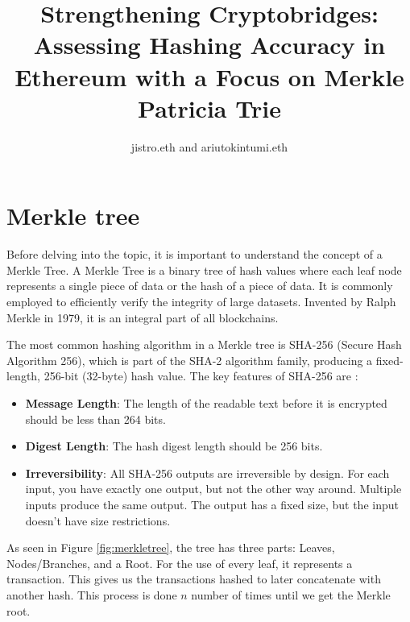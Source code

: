 \documentclass[fleqn,10pt]{olplainarticle}
\title{Strengthening Cryptobridges: Assessing Hashing Accuracy in Ethereum with a Focus on Merkle Patricia Trie}
\author[1]{jistro.eth and ariutokintumi.eth}
\begin{document}
\flushbottom
\maketitle
\thispagestyle{empty}

\tableofcontents

\section{Merkle tree}

Before delving into the topic, it is important to understand the concept of a Merkle Tree. A Merkle Tree is a binary tree of hash values where each leaf node represents a single piece of data or the hash of a piece of data. It is commonly employed to efficiently verify the integrity of large datasets. Invented by Ralph Merkle in 1979, it is an integral part of all blockchains. \cite{kumar_introMerkleTree_2023}

The most common hashing algorithm in a Merkle tree is SHA-256 (Secure Hash Algorithm 256), which is part of the SHA-2 algorithm family, producing a fixed-length, 256-bit (32-byte) hash value. The key features of SHA-256 are \cite{gitlan_whatSHA256_2023}:

\begin{itemize}
	\item \textbf{Message Length}: The length of the readable text before it is encrypted should be less than 264 bits.
	\item \textbf{Digest Length}: The hash digest length should be 256 bits.
	\item \textbf{Irreversibility}: All SHA-256 outputs are irreversible by design. For each input, you have exactly one output, but not the other way around. Multiple inputs produce the same output. The output has a fixed size, but the input doesn’t have size restrictions.
\end{itemize}

As seen in Figure \ref{fig:merkletree}, the tree has three parts: Leaves, Nodes/Branches, and a Root. For the use of every leaf, it represents a transaction. This gives us the transactions hashed to later concatenate with another hash. This process is done 
\(n\) number of times until we get the Merkle root.
\end{document}
